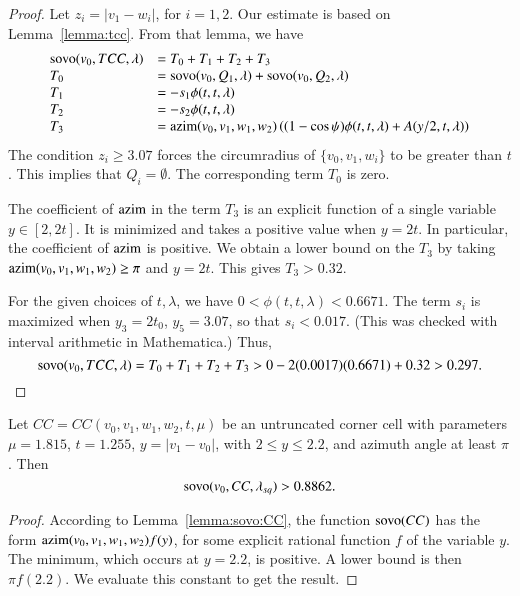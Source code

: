 \begin{proof}
Let $z_i = |v_1-w_i|$, for $i=1,2$.
Our estimate is based on Lemma~\ref{lemma:tcc}.  From that lemma,
we have
  $$
  \begin{array}{lll}
  {\operatorname{sovo}}(v_0,TCC,\lambda) &= T_0 + T_1 + T_2 + T_3 \\
  T_0 &= {\operatorname{sovo}}(v_0,Q_1,\lambda) +  {\operatorname{sovo}}(v_0,Q_2,\lambda)\\
  T_1  &=  - s_1\phi(t,t,\lambda) \\
  T_2  &= - s_2\phi(t,t,\lambda) \\
  T_3 &= 
  {\operatorname{azim}}(v_0,v_1,w_1,w_2) \left((1-\cos\psi)\phi(t,t,\lambda)+
    A(y/2,t,\lambda)\right) \\
  \end{array}
  $$
The condition $z_i\ge3.07$
forces the circumradius of $\{v_0,v_1,w_i\}$ to be greater
than $t$.  This implies that $Q_i=\emptyset$.  The corresponding
term $T_0$ is zero.

The coefficient of ${\operatorname{azim}}$ in the term $T_3$
is an explicit function of a single variable $y\in[2,2t]$.
It is minimized and takes a positive value
when $y=2t$.
In particular,
the coefficient of ${\operatorname{azim}}$ is
positive. We obtain a lower bound on the $T_3$ by taking
${\operatorname{azim}}(v_0,v_1,w_1,w_2)\ge \pi$ and $y=2t$.
This gives $T_3 > 0.32$.

For the given choices of $t,\lambda$, we have
$0 < \phi(t,t,\lambda) < 0.6671$.  The term $s_i$ is
maximized when $y_3=2t_0$, $y_5=3.07$,
so that $s_i < 0.017$.  (This was checked with interval arithmetic in
Mathematica.) Thus,
    $${\operatorname{sovo}}(v_0,TCC,\lambda)  = T_0 + T_1 + T_2 + T_3 >
   0 - 2 (0.0017)(0.6671) +0.32 > 0.297.$$
\end{proof}



\begin{lemma}\label{lemma:CC815}  
Let $CC=CC(v_0,v_1,w_1,w_2,t,\mu)$
be an untruncated corner
cell with parameters $\mu=1.815$, $t=1.255$,
$y=|v_1-v_0|$, with $2\le y\le 2.2$, 
and azimuth angle at least $\pi$.  Then
 $${\operatorname{sovo}}(v_0,CC,\lambda_{sq}) > 0.8862.$$ %
\end{lemma}


\begin{proof}  According to Lemma~\ref{lemma:sovo:CC},
the function ${\operatorname{sovo}}(CC)$ has the form
${\operatorname{azim}}(v_0,v_1,w_1,w_2) f(y)$, for
some explicit rational function $f$ of the
variable $y$. 
The minimum, which occurs at $y=2.2$, is positive.
A lower bound is then $\pi f(2.2)$. 
We evaluate this constant to get the result.
\end{proof}


